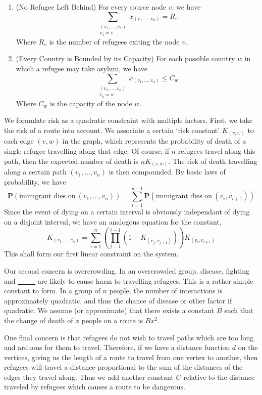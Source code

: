 \documentclass{article}
\begin{document}
\begin{enumerate}
    \item (No Refugee Left Behind) For every source node $v$, we have
    \[ \sum_{\substack{(v_1, \dots, v_n) \\ v_1 = v}} x_{(v_1, \dots, v_n)} = R_v \]
    Where $R_v$ is the number of refugees exiting the node $v$.

    \item (Every Country is Bounded by its Capacity) For each possible country $w$ in which a refugee may take asylum, we have
    \[ \sum_{\substack{(v_1, \dots, v_n) \\ v_n = w}} x_{(v_1, \dots, v_n)} \leq C_w \]
    Where $C_w$ is the capacity of the node $w$.
\end{enumerate}

We formulate risk as a quadratic constraint with multiple factors. First, we take the risk of a route into account. We associate a certain `risk constant' $K_{(v,w)}$ to each edge $(v,w)$ in the graph, which represents the probability of death of a single refugee travelling along that edge. Of course, if $n$ refugees travel along this path, then the expected number of death is $n K_{(v,w)}$. The risk of death travelling along a certain path $(v_1, \dots, v_n)$ is then compounded. By basic laws of probability, we have
%
\[ \mathbf{P}(\text{immigrant dies on}\ (v_1, \dots, v_n)) = \sum_{i = 1}^{n-1} \mathbf{P}(\text{immigrant dies on}\ (v_i, v_{i+1})) \]
%
Since the event of dying on a certain interval is obviously independant of dying on a disjoint interval, we have an analogous equation for the constant,
%
\[ K_{(v_1, \dots, v_n)} = \sum_{i = 1}^n \left( \prod_{j = 1}^{i-1} \left(1 - K_{(v_j,v_{j+1})} \right) \right) K_{(v_i, v_{i+1})} \]
%
This shall form our first linear constraint on the system.

Our second concern is overcrowding. In an overcrowded group, disease, fighting and \underline{\ \ \ \ \ } are likely to cause harm to travelling refugees. This is a rather simple constant to form. In a group of $n$ people, the number of interactions is approximately quadratic, and thus the chance of disease or other factor if quadratic. We assume (or approximate) that there exists a constant $B$ such that the change of death of $x$ people on a route is $Bx^2$.

One final concern is that refugees do not wish to travel paths which are too long and arduous for them to travel. Therefore, if we have a distance function $d$ on the vertices, giving us the length of a route to travel from one vertex to another, then refugees will travel a distance proportional to the sum of the distances of the edges they travel along. Thus we add another constant $C$ relative to the distance traveled by refugees which causes a route to be dangerous.
\end{document}
